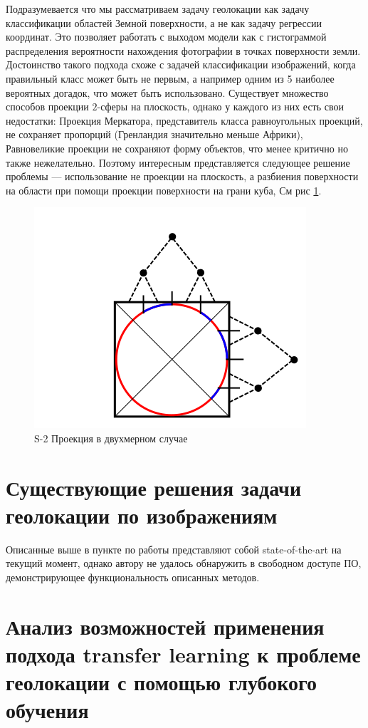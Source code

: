 Подразумевается что мы рассматриваем задачу геолокации как задачу классификации областей Земной поверхности, а не как задачу регрессии координат. Это позволяет работать с выходом модели как с гистограммой распределения вероятности нахождения фотографии в точках поверхности земли.
Достоинство такого подхода схоже с задачей классификации изображений, когда правильный класс может быть не первым, а например одним из 5 наиболее вероятных догадок, что может быть использовано.
Существует множество способов проекции $2$-сферы на плоскость, однако у каждого из них есть свои недостатки:
Проекция Меркатора, представитель класса равноугольных проекций, не сохраняет пропорций (Гренландия значительно меньше Африки), Равновеликие проекции не сохраняют форму объектов, что менее критично но также нежелательно.
Поэтому интересным представляется следующее решение проблемы --- использование не проекции  на плоскость, а разбиения поверхности на области при помощи проекции поверхности на грани куба, См рис \ref{pic:projection}.
\begin{figure}
	\centering
	\includegraphics{img/projection}
	\caption{S-2 Проекция в двухмерном случае}
	\label{pic:projection}
\end{figure}

\section{Существующие решения задачи геолокации по изображениям}

Описанные выше в пункте по работы представляют собой state-of-the-art на текущий момент, однако автору не удалось обнаружить в свободном доступе ПО, демонстрирующее функциональность описанных методов.


\section{Анализ возможностей применения подхода transfer learning к проблеме геолокации с помощью глубокого обучения}


